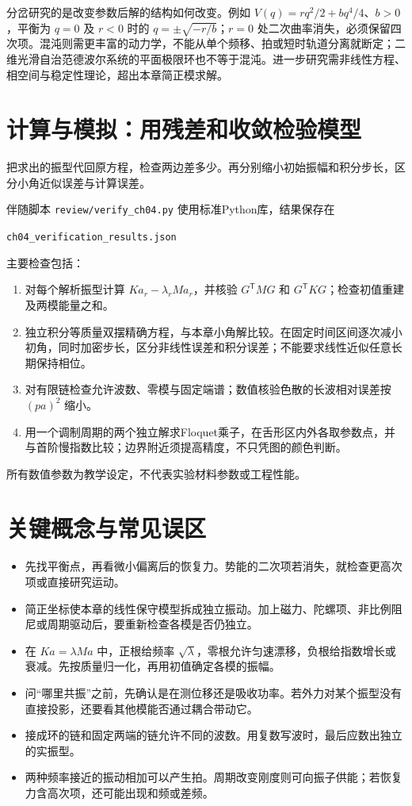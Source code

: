 分岔研究的是改变参数后解的结构如何改变。例如 $V(q)=rq^2/2+bq^4/4$、$b>0$，平衡为 $q=0$ 及 $r<0$ 时的 $q=\pm\sqrt{-r/b}$；$r=0$ 处二次曲率消失，必须保留四次项。混沌则需更丰富的动力学，不能从单个频移、拍或短时轨道分离就断定；二维光滑自治范德波尔系统的平面极限环也不等于混沌。进一步研究需非线性方程、相空间与稳定性理论，超出本章简正模求解。

\section{计算与模拟：用残差和收敛检验模型}
把求出的振型代回原方程，检查两边差多少。再分别缩小初始振幅和积分步长，区分小角近似误差与计算误差。

伴随脚本 \texttt{review/verify\_ch04.py} 使用标准Python库，结果保存在
\begin{center}\texttt{ch04\_verification\_results.json}\end{center}
主要检查包括：
\begin{enumerate}[leftmargin=1.8em]
\item 对每个解析振型计算 $Ka_r-\lambda_rMa_r$，并核验 $G^{\mathsf T}MG$ 和 $G^{\mathsf T}KG$；检查初值重建及两模能量之和。
\item 独立积分等质量双摆精确方程，与本章小角解比较。在固定时间区间逐次减小初角，同时加密步长，区分非线性误差和积分误差；不能要求线性近似任意长期保持相位。
\item 对有限链检查允许波数、零模与固定端谱；数值核验色散的长波相对误差按 $(pa)^2$ 缩小。
\item 用一个调制周期的两个独立解求Floquet乘子，在舌形区内外各取参数点，并与首阶慢指数比较；边界附近须提高精度，不只凭图的颜色判断。
\end{enumerate}
所有数值参数为教学设定，不代表实验材料参数或工程性能。

\section*{关键概念与常见误区}
\begin{itemize}[leftmargin=1.8em]
\item 先找平衡点，再看微小偏离后的恢复力。势能的二次项若消失，就检查更高次项或直接研究运动。
\item 简正坐标使本章的线性保守模型拆成独立振动。加上磁力、陀螺项、非比例阻尼或周期驱动后，要重新检查各模是否仍独立。
\item 在 $Ka=\lambda Ma$ 中，正根给频率 $\sqrt{\lambda}$，零根允许匀速漂移，负根给指数增长或衰减。先按质量归一化，再用初值确定各模的振幅。
\item 问“哪里共振”之前，先确认是在测位移还是吸收功率。若外力对某个振型没有直接投影，还要看其他模能否通过耦合带动它。
\item 接成环的链和固定两端的链允许不同的波数。用复数写波时，最后应数出独立的实振型。
\item 两种频率接近的振动相加可以产生拍。周期改变刚度则可向振子供能；若恢复力含高次项，还可能出现和频或差频。
\end{itemize}

